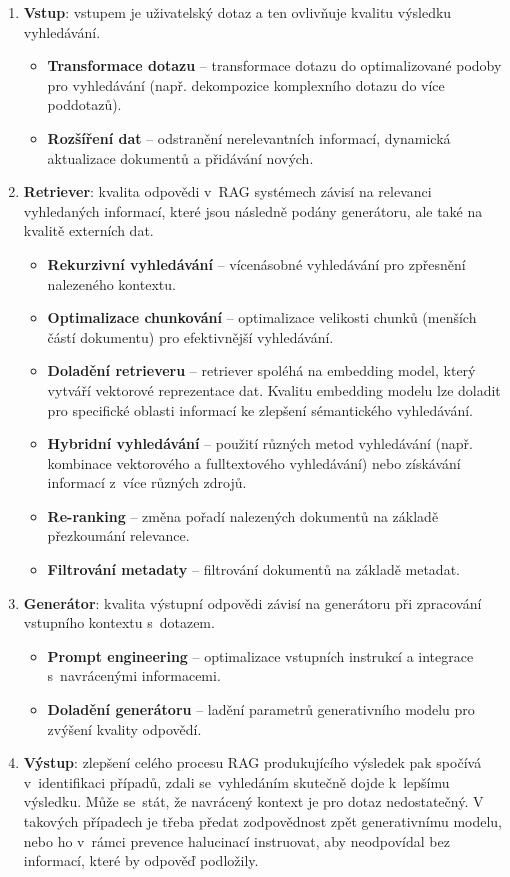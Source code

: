 \begin{enumerate}
    \item \textbf{Vstup}: vstupem je uživatelský dotaz a ten ovlivňuje kvalitu výsledku vyhledávání.
    \begin{itemize}
        \item \textbf{Transformace dotazu} – transformace dotazu do optimalizované podoby pro vyhledávání (např. dekompozice komplexního dotazu do více poddotazů).
        \item \textbf{Rozšíření dat} – odstranění nerelevantních informací, dynamická aktualizace dokumentů a přidávání nových.
    \end{itemize}
    
    \item \textbf{Retriever}: kvalita odpovědi v~RAG systémech závisí na relevanci vyhledaných informací, které jsou následně podány generátoru, ale také na kvalitě externích dat.
    \begin{itemize}
        \item \textbf{Rekurzivní vyhledávání} – vícenásobné vyhledávání pro zpřesnění nalezeného kontextu.
        \item \textbf{Optimalizace chunkování} – optimalizace velikosti chunků (menších částí dokumentu) pro efektivnější vyhledávání.
        \item \textbf{Doladění retrieveru} – retriever spoléhá na embedding model, který vytváří vektorové reprezentace dat. Kvalitu embedding modelu lze doladit pro specifické oblasti informací ke zlepšení sémantického vyhledávání.
        \item \textbf{Hybridní vyhledávání} – použití různých metod vyhledávání (např. kombinace vektorového a fulltextového vyhledávání) nebo získávání informací z~více různých zdrojů.
        \item \textbf{Re-ranking} – změna pořadí nalezených dokumentů na základě přezkoumání relevance.
        \item \textbf{Filtrování metadaty} – filtrování dokumentů na základě metadat.
    \end{itemize}
    
    \item \textbf{Generátor}: kvalita výstupní odpovědi závisí na generátoru při zpracování vstupního kontextu s~dotazem.
    \begin{itemize}
        \item \textbf{Prompt engineering} – optimalizace vstupních instrukcí a integrace s~navrácenými informacemi.
        \item \textbf{Doladění generátoru} – ladění parametrů generativního modelu pro zvýšení kvality odpovědí.
    \end{itemize}

    \item \textbf{Výstup}: zlepšení celého procesu RAG produkujícího výsledek pak spočívá v~identifikaci případů, zdali se~vyhledáním skutečně dojde k~lepšímu výsledku. Může se~stát, že navrácený kontext je pro dotaz nedostatečný. V takových případech je třeba předat zodpovědnost zpět generativnímu modelu, nebo ho v~rámci prevence halucinací instruovat, aby neodpovídal bez informací, které by odpověď podložily.
\end{enumerate}


